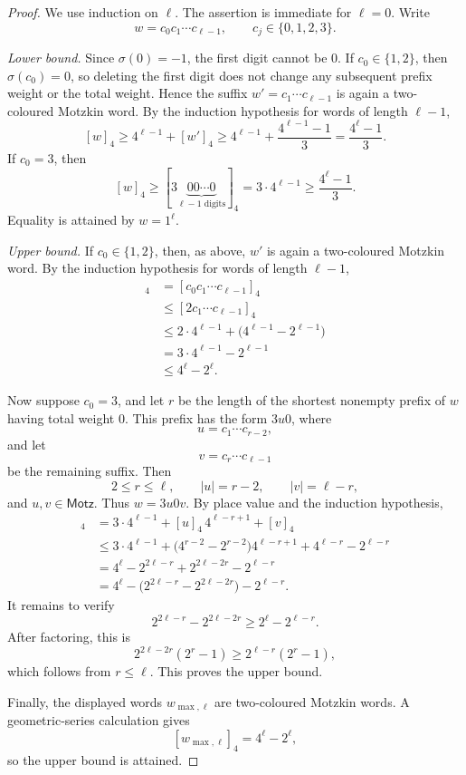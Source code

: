 \documentclass[11pt]{article}
\theoremstyle{plain}
\theoremstyle{definition}
\begin{document}
\begin{proof}
We use induction on $\ell$.  The assertion is immediate for $\ell=0$.
Write
\[
 w=c_0c_1\cdots c_{\ell-1},
 \qquad
 c_j\in\{0,1,2,3\}.
\]

\emph{Lower bound.}
Since $\sigma(0)=-1$, the first digit cannot be $0$.  If $c_0\in\{1,2\}$, then $\sigma(c_0)=0$, so deleting the first
digit does not change any subsequent prefix weight or the total weight.
Hence the suffix $w'=c_1\cdots c_{\ell-1}$ is again a two-coloured
Motzkin word.  By the induction hypothesis for words of length $\ell-1$,
\[
  [w]_4\geq4^{\ell-1}+[w']_4
  \geq4^{\ell-1}+\frac{4^{\ell-1}-1}{3}
  =\frac{4^{\ell}-1}{3}.
\]
If $c_0=3$, then
\[
  [w]_4
  \geq[3\underbrace{00\cdots0}_{\ell-1\text{ digits}}]_4
  =3\cdot4^{\ell-1}
  \geq\frac{4^{\ell}-1}{3}.
\]
Equality is attained by $w=1^{\ell}$.

\emph{Upper bound.}
If $c_0\in\{1,2\}$, then, as above, $w'$ is again a two-coloured
Motzkin word.  By the induction hypothesis for words of length $\ell-1$,
\begin{align*}
  [w]_4
  &=[c_0c_1\cdots c_{\ell-1}]_4\\
  &\leq[2c_1\cdots c_{\ell-1}]_4\\
  &\leq2\cdot4^{\ell-1}+\bigl(4^{\ell-1}-2^{\ell-1}\bigr)\\
  &=3\cdot4^{\ell-1}-2^{\ell-1}\\
  &\leq4^{\ell}-2^{\ell}.
\end{align*}

Now suppose $c_0=3$, and let $r$ be the length of the shortest nonempty
prefix of $w$ having total weight $0$.  This prefix has the form $3u0$,
where
\[
 u=c_1\cdots c_{r-2},
\]
and let
\[
 v=c_r\cdots c_{\ell-1}
\]
be the remaining suffix.  Then
\[
 2\leq r\leq\ell,
 \qquad
 |u|=r-2,
 \qquad
 |v|=\ell-r,
\]
and $u,v\in\mathsf{Motz}$.  Thus $w=3u0v$.  By place value and the induction hypothesis,
\begin{align*}
  [w]_4
  &=3\cdot4^{\ell-1}+[u]_4\,4^{\ell-r+1}+[v]_4\\
  &\leq3\cdot4^{\ell-1}
    +\bigl(4^{r-2}-2^{r-2}\bigr)4^{\ell-r+1}
    +4^{\ell-r}-2^{\ell-r}\\
  &=4^{\ell}-2^{2\ell-r}+2^{2\ell-2r}-2^{\ell-r}\\
  &=4^{\ell}-\bigl(2^{2\ell-r}-2^{2\ell-2r}\bigr)-2^{\ell-r}.
\end{align*}
It remains to verify
\[
  2^{2\ell-r}-2^{2\ell-2r}
  \geq2^{\ell}-2^{\ell-r}.
\]
After factoring, this is
\[
  2^{2\ell-2r}(2^r-1)\geq2^{\ell-r}(2^r-1),
\]
which follows from $r\leq\ell$.  This proves the upper bound.

Finally, the displayed words $w_{\max,\ell}$ are two-coloured Motzkin words.
A geometric-series calculation gives
\[
  [w_{\max,\ell}]_4=4^{\ell}-2^{\ell},
\]
so the upper bound is attained.
\end{proof}
\end{document}
